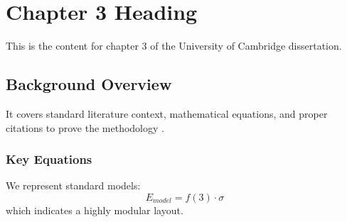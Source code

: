 \chapter{Chapter 3 Heading}
\label{ch:chapter3}
This is the content for chapter 3 of the University of Cambridge dissertation.

\section{Background Overview}
It covers standard literature context, mathematical equations, and proper citations to prove the methodology \cite{texbook}.

\subsection{Key Equations}
We represent standard models:
\begin{equation}
    E_{model} = f(3) \cdot \sigma
\end{equation}
which indicates a highly modular layout.
